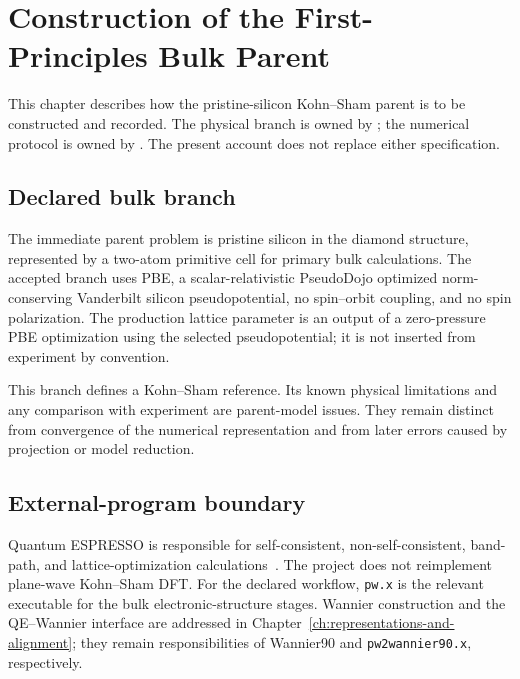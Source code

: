 \chapter{Construction of the First-Principles Bulk Parent}

\label{ch:first-principles-parent}


This chapter describes how the pristine-silicon Kohn--Sham parent is to be
constructed and recorded. The physical branch is owned by
; the numerical
protocol is owned by
. The present
account does not replace either specification.

\section{Declared bulk branch}


The immediate parent problem is pristine silicon in the diamond structure,
represented by a two-atom primitive cell for primary bulk calculations. The
accepted branch uses PBE, a scalar-relativistic PseudoDojo optimized
norm-conserving Vanderbilt silicon pseudopotential, no spin--orbit coupling, and
no spin polarization. The production lattice parameter is an output of a
zero-pressure PBE optimization using the selected pseudopotential; it is not
inserted from experiment by convention.

This branch defines a Kohn--Sham reference. Its known physical limitations and
any comparison with experiment are parent-model issues. They remain distinct
from convergence of the numerical representation and from later errors caused
by projection or model reduction.

\section{External-program boundary}


Quantum ESPRESSO is responsible for self-consistent, non-self-consistent,
band-path, and lattice-optimization calculations~\cite{giannozzi2009}. The
project does not
reimplement plane-wave Kohn--Sham DFT. For the declared workflow,
\texttt{pw.x} is the relevant executable for the bulk electronic-structure
stages. Wannier construction and the QE--Wannier interface are addressed in
Chapter~\ref{ch:representations-and-alignment}; they remain responsibilities of
Wannier90 and \texttt{pw2wannier90.x}, respectively.

